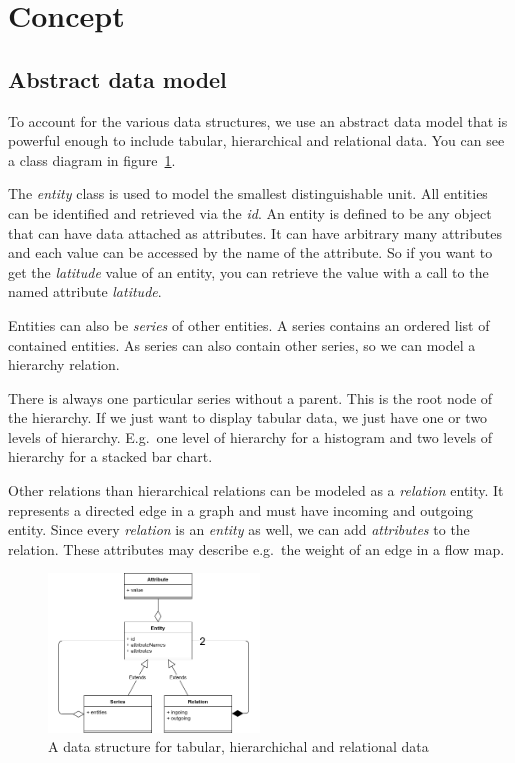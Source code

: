 \documentclass{article}
\begin{document}
\clearpage
\section{Concept}\label{sec:concept}



\subsection{Abstract data model}
To account for the various data structures, we use an abstract data model that is powerful enough to include tabular, hierarchical and relational data.
You can see a class diagram in figure~\ref{fig:concept:meta-data-structure}.

The \emph{entity} class is used to model the smallest distinguishable unit.
All entities can be identified and retrieved via the \emph{id}.
An entity is defined to be any object that can have data attached as attributes.
It can have arbitrary many attributes and each value can be accessed by the name of the attribute.
So if you want to get the \emph{latitude} value of an entity, you can retrieve the value with a call to the named attribute \emph{latitude}.

Entities can also be \emph{series} of other entities.
A series contains an ordered list of contained entities.
As series can also contain other series, so we can model a hierarchy relation.

There is always one particular series without a parent.
This is the root node of the hierarchy.
If we just want to display tabular data, we just have one or two levels of hierarchy.
E.g.\ one level of hierarchy for a histogram and two levels of hierarchy for a stacked bar chart.

Other relations than hierarchical relations can be modeled as a \emph{relation} entity.
It represents a directed edge in a graph and must have incoming and outgoing entity.
Since every \emph{relation} is an \emph{entity} as well, we can add \emph{attributes} to the relation.
These attributes may describe e.g.\ the weight of an edge in a flow map.


\begin{figure}[h!]
  \centering
  \includegraphics[width=0.5\textwidth]{images/meta-data-structure.png}
  \caption{A data structure for tabular, hierarchichal and relational data}
  \label{fig:concept:meta-data-structure}
\end{figure}
\end{document}
